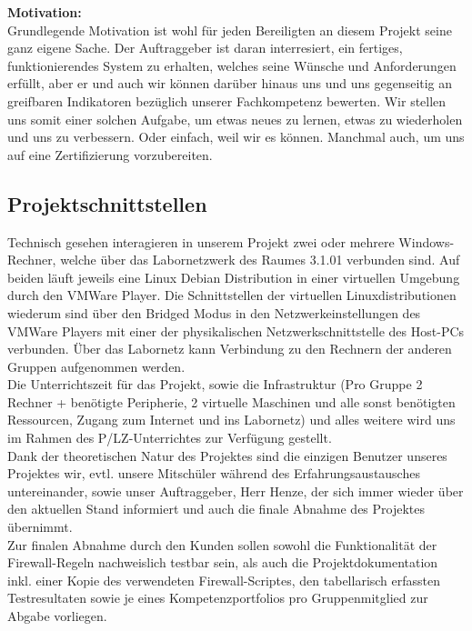     \textbf{Motivation:}\\
    Grundlegende Motivation ist wohl für jeden Bereiligten an diesem Projekt seine ganz eigene Sache. Der Auftraggeber ist daran interresiert, ein fertiges, funktionierendes System zu erhalten, welches seine Wünsche und Anforderungen erfüllt, aber er und auch wir können darüber hinaus uns und uns gegenseitig an greifbaren Indikatoren bezüglich unserer  Fachkompetenz bewerten. Wir stellen uns somit einer solchen Aufgabe, um etwas neues zu lernen, etwas zu wiederholen und uns zu verbessern. Oder einfach, weil wir es können. Manchmal auch, um uns auf eine Zertifizierung vorzubereiten.

\subsection{Projektschnittstellen} 
\label{sec:Projektschnittstellen}

    Technisch gesehen interagieren in unserem Projekt zwei oder mehrere Windows-Rechner, welche über das Labornetzwerk des Raumes 3.1.01 verbunden sind. Auf beiden läuft jeweils eine Linux Debian Distribution in einer virtuellen Umgebung durch den VMWare Player. Die Schnittstellen der virtuellen Linuxdistributionen wiederum sind über den Bridged Modus in den Netzwerkeinstellungen des VMWare Players mit einer der physikalischen Netzwerkschnittstelle des Host-PCs verbunden. Über das Labornetz kann Verbindung zu den Rechnern der anderen Gruppen aufgenommen werden.\\
    Die Unterrichtszeit für das Projekt, sowie die Infrastruktur (Pro Gruppe 2 Rechner + benötigte Peripherie, 2 virtuelle Maschinen und alle sonst benötigten Ressourcen, Zugang zum Internet und ins Labornetz) und alles weitere wird uns im Rahmen des P/LZ-Unterrichtes zur Verfügung gestellt.\\
    Dank der theoretischen Natur des Projektes sind die einzigen Benutzer unseres Projektes wir, evtl. unsere Mitschüler während des Erfahrungsaustausches untereinander, sowie unser Auftraggeber, Herr Henze, der sich immer wieder über den aktuellen Stand informiert und auch die finale Abnahme des Projektes übernimmt.\\ 
    Zur finalen Abnahme durch den Kunden sollen sowohl die Funktionalität der Firewall-Regeln nachweislich testbar sein, als auch die Projektdokumentation inkl. einer Kopie des verwendeten Firewall-Scriptes, den tabellarisch erfassten Testresultaten sowie je eines Kompetenzportfolios pro Gruppenmitglied zur Abgabe vorliegen.

